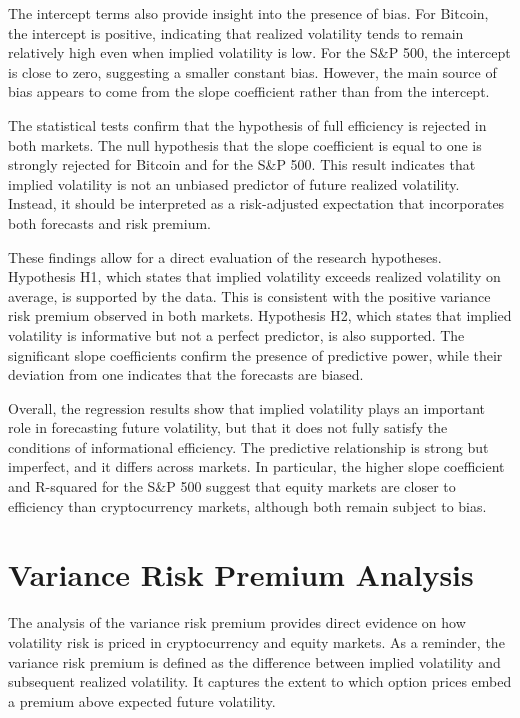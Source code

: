 \documentclass[11pt,a4paper,openany]{report}
\begin{document}
The intercept terms also provide insight into the presence of bias. For
Bitcoin, the intercept is positive, indicating that realized volatility
tends to remain relatively high even when implied volatility is low. For
the S\&P 500, the intercept is close to zero, suggesting a smaller
constant bias. However, the main source of bias appears to come from the
slope coefficient rather than from the intercept.

The statistical tests confirm that the hypothesis of full efficiency is
rejected in both markets. The null hypothesis that the slope coefficient
is equal to one is strongly rejected for Bitcoin and for the S\&P 500.
This result indicates that implied volatility is not an unbiased
predictor of future realized volatility. Instead, it should be
interpreted as a risk-adjusted expectation that incorporates both
forecasts and risk premium.

These findings allow for a direct evaluation of the research hypotheses.
Hypothesis H1, which states that implied volatility exceeds realized
volatility on average, is supported by the data. This is consistent with
the positive variance risk premium observed in both markets. Hypothesis
H2, which states that implied volatility is informative but not a
perfect predictor, is also supported. The significant slope coefficients
confirm the presence of predictive power, while their deviation from one
indicates that the forecasts are biased.

Overall, the regression results show that implied volatility plays an
important role in forecasting future volatility, but that it does not
fully satisfy the conditions of informational efficiency. The predictive
relationship is strong but imperfect, and it differs across markets. In
particular, the higher slope coefficient and R-squared for the S\&P 500
suggest that equity markets are closer to efficiency than cryptocurrency
markets, although both remain subject to bias.

\section{Variance Risk Premium
Analysis}\label{variance-risk-premium-analysis}

The analysis of the variance risk premium provides direct evidence on
how volatility risk is priced in cryptocurrency and equity markets. As a
reminder, the variance risk premium is defined as the difference between
implied volatility and subsequent realized volatility. It captures the
extent to which option prices embed a premium above expected future
volatility.
\end{document}
